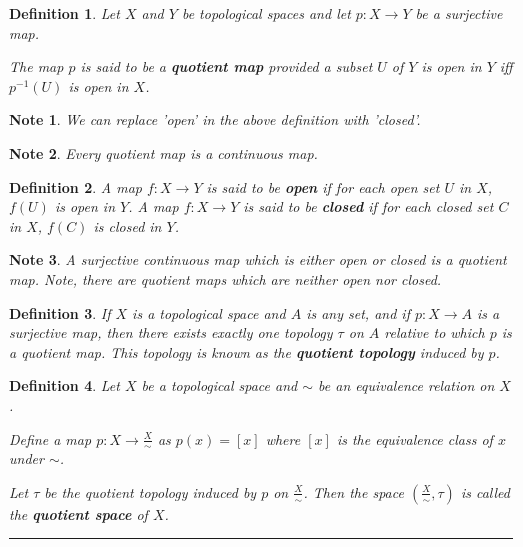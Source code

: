 \documentclass[14pt,twoside]{extreport}
\newcommand{\hhrule}{\vspace{1cm}\hrule\vspace{1cm}}
\theoremstyle{dotless}
\newtheorem*{defn}{Definition}
\newtheorem*{note}{Note} %
\begin{document}
\begin{defn}
    Let $X$ and $Y$ be topological spaces and let $p: X \to Y$ be a surjective map. 

    The map $p$ is said to be a \textbf{quotient map} provided a subset $U$ of $Y$ is open in $Y$ iff $p^{-1}(U)$ is open in $X$.
\end{defn}

\begin{note}
    We can replace 'open' in the above definition with 'closed'.
\end{note}

\begin{note}
    Every quotient map is a continuous map.
\end{note}

\begin{defn}
    A map $f: X \to Y$ is said to be \textbf{open} if for each open set $U$ in $X$, $f(U)$ is open in $Y$.
    A map $f: X \to Y$ is said to be \textbf{closed} if for each closed set $C$ in $X$, $f(C)$ is closed in $Y$.
\end{defn}


\begin{note}
    A surjective continuous map which is either open or closed is a quotient map. Note, there are quotient maps which are neither open nor closed.
\end{note}

\begin{defn}
    If $X$ is a topological space and $A$ is any set, and if $p: X \to A$ is a surjective map, then there exists exactly one topology $\tau$ on $A$ relative to which $p$ is a quotient map. This topology is known as the \textbf{quotient topology} induced by $p$.
\end{defn}

\begin{defn}
    Let $X$ be a topological space and $\sim$ be an equivalence relation on $X$. 

    Define a map $p: X \to \frac{X}{\sim}$ as $p(x) = [x]$ where $[x]$ is the equivalence class of $x$ under $\sim$.

    Let $\tau$ be the quotient topology induced by $p$ on $\frac{X}{\sim}$. Then the space $(\frac{X}{\sim}, \tau)$ is called the \textbf{quotient space} of $X$.
\end{defn}


\hhrule
\end{document}
